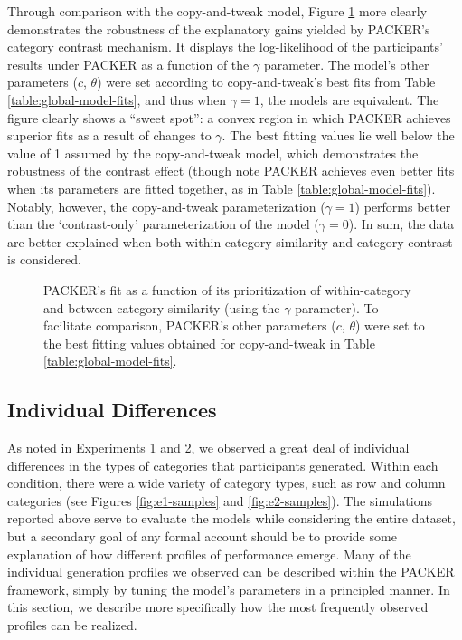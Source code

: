 \documentclass[12pt]{article}
\newcommand\inputpgf[2]{{
\let\pgfimageWithoutPath\pgfimage
\renewcommand{\pgfimage}[2][]{\pgfimageWithoutPath[##1]{#1/##2}}

}}
\begin{document}
\begin{flushleft}
Through comparison with the copy-and-tweak model, Figure \ref{fig:packer-loglike} more clearly demonstrates the robustness of the explanatory gains yielded by PACKER's category contrast mechanism. It displays the log-likelihood of the participants' results under PACKER as a function of the $\gamma$ parameter. The model's other parameters ($c$, $\theta$) were set according to copy-and-tweak's best fits from Table \ref{table:global-model-fits}, and thus when $\gamma=1$, the models are equivalent. The figure clearly shows a ``sweet spot'':  a convex region in which PACKER achieves superior fits as a result of changes to $\gamma$. The best fitting values lie well below the value of 1 assumed by the copy-and-tweak model, which demonstrates the robustness of the contrast effect (though note PACKER achieves even better fits when its parameters are fitted together, as in Table \ref{table:global-model-fits}). Notably, however, the copy-and-tweak parameterization ($\gamma=1$) performs better than the `contrast-only' parameterization of the model ($\gamma = 0$). In sum, the data are better explained when both within-category similarity and category contrast is considered.

\begin{figure}
    \begin{center}
    \inputpgf{figs/}{packer-loglike.pgf}
    \caption{PACKER's fit as a function of its prioritization of within-category and between-category similarity (using the $\gamma$ parameter). To facilitate comparison, PACKER's other parameters ($c$, $\theta$) were set to the best fitting values obtained for copy-and-tweak in Table \ref{table:global-model-fits}. }
    \label{fig:packer-loglike}
    \end{center}
\end{figure}


\subsection{Individual Differences}
\label{section:individual-diffs}

As noted in Experiments 1 and 2, we observed a great deal of individual differences in the types of categories that participants generated. Within each condition, there were a wide variety of category types, such as row and column categories (see Figures \ref{fig:e1-samples} and \ref{fig:e2-samples}). The simulations reported above serve to evaluate the models while considering the entire dataset, but a secondary goal of any formal account should be to provide some explanation of how different profiles of performance emerge. Many of the individual generation profiles we observed can be described within the PACKER framework, simply by tuning the model's parameters in a principled manner. In this section, we describe more specifically how the most frequently observed profiles can be realized.


\end{flushleft}
\end{document}
